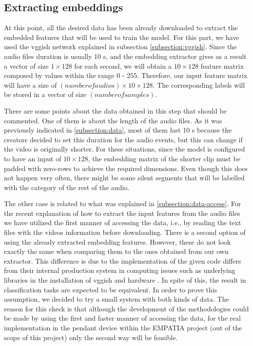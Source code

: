 \subsection{Extracting embeddings}
\label{subsection:extracting-embeddings}

	At this point, all the desired data has been already downloaded to extract the embedded features that will be used to train the model. For this part, we have used the \acrshort{vgg}ish network explained in subsection \ref{subsection:vggish}. Since the audio files duration is usually 10 s, and the embedding extractor gives as a result a vector of size $1 \times 128$ for each second, we will obtain a $10 \times 128$ feature matrix composed by values within the range 0 - 255. Therefore, our input feature matrix will have a size of $(number of audios) \times 10 \times 128$. The corresponding labels will be stored in a vector of size $(number of samples)$.
	
	There are some points about the data obtained in this step that should be commented. One of them is about the length of the audio files. As it was previously indicated in \ref{subsection:data}, most of them last 10 s because the creators decided to set this duration for the audio events, but this can change if the video is originally shorter. For these situations, since the model is configured to have an input of $10 \times 128$, the embedding matrix of the shorter clip must be padded with zero-rows to achieve the required dimensions. Even though this does not happen very often, there might be some silent segments that will be labelled with the category of the rest of the audio. 
	
	The other case is related to what was explained in \ref{subsection:data-access}. For the recent explanation of how to extract the input features from the audio files we have utilized the first manner of accessing the data, i.e., by reading the text files with the videos information before downloading. There is a second option of using the already extracted embedding features. However, these do not look exactly the same when comparing them to the ones obtained from our own extractor. This difference is due to the implementation of the given code differs from their internal production system in computing issues such as underlying libraries in the installation of \acrshort{vgg}ish and hardware . In spite of this, the result in classification tasks are expected to be equivalent. In order to prove this assumption, we decided to try a small system with both kinds of data. The reason for this check is that although the development of the methodologies could be made by using the first and faster manner of accessing the data, for the real implementation in the pendant device within the EMPATIA project (out of the scope of this project) only the second way will be feasible.
	
